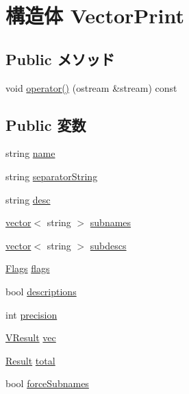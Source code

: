\hypertarget{structStats_1_1VectorPrint}{
\section{構造体 VectorPrint}
\label{structStats_1_1VectorPrint}
}
\subsection*{Public メソッド}
\begin{DoxyCompactItemize}
\item 
void \hyperlink{structStats_1_1VectorPrint_ab796867ec17c9aaf14b8e44923fc17e4}{operator()} (ostream \&stream) const 
\end{DoxyCompactItemize}
\subsection*{Public 変数}
\begin{DoxyCompactItemize}
\item 
string \hyperlink{structStats_1_1VectorPrint_a8ccf841cb59e451791bcb2e1ac4f1edc}{name}
\item 
string \hyperlink{structStats_1_1VectorPrint_ae18f266d1f96dc3dc8b179e00cf6c6f1}{separatorString}
\item 
string \hyperlink{structStats_1_1VectorPrint_acc6fde76f2c440ef4a9f7dc3765038b5}{desc}
\item 
\hyperlink{classstd_1_1vector}{vector}$<$ string $>$ \hyperlink{structStats_1_1VectorPrint_a1bd9e61da02e0bbea57d9e263878e5f3}{subnames}
\item 
\hyperlink{classstd_1_1vector}{vector}$<$ string $>$ \hyperlink{structStats_1_1VectorPrint_ae1224c73a79572f64a632c7fe951ec57}{subdescs}
\item 
\hyperlink{classFlags}{Flags} \hyperlink{structStats_1_1VectorPrint_aa991e2b209ef26272bf4fd920777bcda}{flags}
\item 
bool \hyperlink{structStats_1_1VectorPrint_ada0eec8923acca0939a06f40c6a88af8}{descriptions}
\item 
int \hyperlink{structStats_1_1VectorPrint_aa95455ed52a8459fad69509a4a0411b5}{precision}
\item 
\hyperlink{classstd_1_1vector}{VResult} \hyperlink{structStats_1_1VectorPrint_a539785a2cf8aa37d52a6023051f9f797}{vec}
\item 
\hyperlink{namespaceStats_ad874d2cfd4b4a29ebd480bb2e67f20ae}{Result} \hyperlink{structStats_1_1VectorPrint_a7e957a9c5865c112db82214b368136e6}{total}
\item 
bool \hyperlink{structStats_1_1VectorPrint_a8545c859ef3a99dbc94c6ff9945e8024}{forceSubnames}
\end{DoxyCompactItemize}


